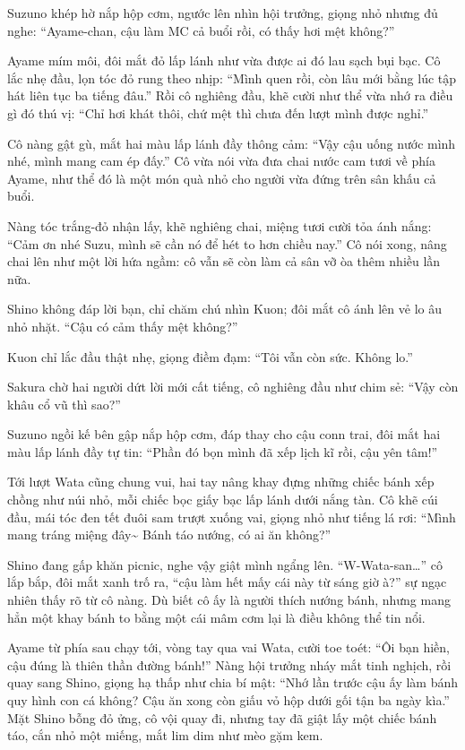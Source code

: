 \documentclass[../main.tex]{subfiles}
\begin{document}
Suzuno khép hờ nắp hộp cơm, ngước lên nhìn hội trưởng, giọng nhỏ nhưng đủ nghe: ``Ayame-chan, cậu làm MC cả buổi rồi, có thấy hơi mệt không?''

Ayame mím môi, đôi mắt đỏ lấp lánh như vừa được ai đó lau sạch bụi bạc. Cô lắc nhẹ đầu, lọn tóc đỏ rung theo nhịp: ``Mình quen rồi, còn lâu mới bằng lúc tập hát liên tục ba tiếng đâu.'' Rồi cô nghiêng đầu, khẽ cười như thể vừa nhớ ra điều gì đó thú vị: ``Chỉ hơi khát thôi, chứ mệt thì chưa đến lượt mình được nghỉ.''

Cô nàng gật gù, mắt hai màu lấp lánh đầy thông cảm: ``Vậy cậu uống nước mình nhé, mình mang cam ép đấy.'' Cô vừa nói vừa đưa chai nước cam tươi về phía Ayame, như thể đó là một món quà nhỏ cho người vừa đứng trên sân khấu cả buổi.

Nàng tóc trắng-đỏ nhận lấy, khẽ nghiêng chai, miệng tươi cười tỏa ánh nắng: ``Cảm ơn nhé Suzu, mình sẽ cần nó để hét to hơn chiều nay.'' Cô nói xong, nâng chai lên như một lời hứa ngầm: cô vẫn sẽ còn làm cả sân vỡ òa thêm nhiều lần nữa.

Shino không đáp lời bạn, chỉ chăm chú nhìn Kuon; đôi mắt cô ánh lên vẻ lo âu nhỏ nhặt. ``Cậu có cảm thấy mệt không?''

Kuon chỉ lắc đầu thật nhẹ, giọng điềm đạm: ``Tôi vẫn còn sức. Không lo.''

Sakura chờ hai người dứt lời mới cất tiếng, cô nghiêng đầu như chim sẻ: ``Vậy còn khâu cổ vũ thì sao?''

Suzuno ngồi kế bên gập nắp hộp cơm, đáp thay cho cậu conn trai, đôi mắt hai màu lấp lánh đầy tự tin: ``Phần đó bọn mình đã xếp lịch kĩ rồi, cậu yên tâm!''

\il

Tới lượt Wata cũng chung vui, hai tay nâng khay đựng những chiếc bánh xếp chồng như núi nhỏ, mỗi chiếc bọc giấy bạc lấp lánh dưới nắng tàn. Cô khẽ cúi đầu, mái tóc đen tết đuôi sam trượt xuống vai, giọng nhỏ như tiếng lá rơi: ``Mình mang tráng miệng đây\~{} Bánh táo nướng, có ai ăn không?''

Shino đang gấp khăn picnic, nghe vậy giật mình ngẩng lên. ``W-Wata-san\dots'' cô lắp bắp, đôi mắt xanh trố ra, ``cậu làm hết mấy cái này từ sáng giờ à?'' sự ngạc nhiên thấy rõ từ cô nàng. Dù biết cô ấy là người thích nướng bánh, nhưng mang hẳn một khay bánh to bằng một cái mâm cơm lại là điều không thể tin nổi.

Ayame từ phía sau chạy tới, vòng tay qua vai Wata, cười toe toét: ``Ôi bạn hiền, cậu đúng là thiên thần đường bánh!'' Nàng hội trưởng nháy mắt tinh nghịch, rồi quay sang Shino, giọng hạ thấp như chia bí mật: ``Nhớ lần trước cậu ấy làm bánh quy hình con cá không? Cậu ăn xong còn giấu vỏ hộp dưới gối tận ba ngày kìa.'' Mặt Shino bỗng đỏ ửng, cô vội quay đi, nhưng tay đã giật lấy một chiếc bánh táo, cắn nhỏ một miếng, mắt lim dim như mèo gặm kem.
\end{document}

